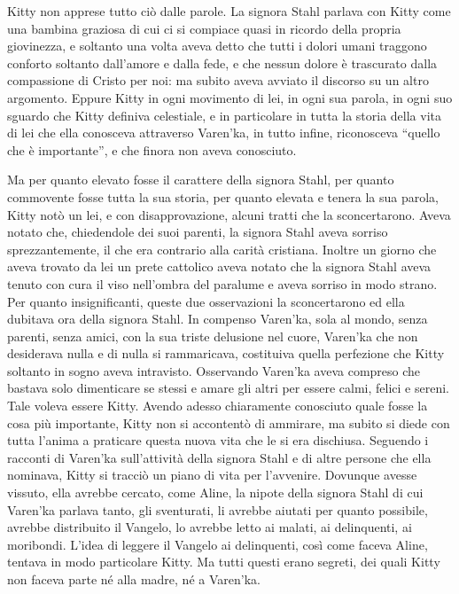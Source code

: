 Kitty non apprese tutto ciò dalle parole. La signora Stahl parlava con Kitty come una bambina graziosa di cui ci si compiace quasi in ricordo della propria giovinezza, e soltanto una volta aveva detto che tutti i dolori umani traggono conforto soltanto dall'amore e dalla fede, e che nessun dolore è trascurato dalla compassione di Cristo per noi: ma subito aveva avviato il discorso su un altro argomento. Eppure Kitty in ogni movimento di lei, in ogni sua parola, in ogni suo sguardo che Kitty definiva celestiale, e in particolare in tutta la storia della vita di lei che ella conosceva attraverso Varen'ka, in tutto infine, riconosceva ``quello che è importante'', e che finora non aveva conosciuto. 

Ma per quanto elevato fosse il carattere della signora Stahl, per quanto commovente fosse tutta la sua storia, per quanto elevata e tenera la sua parola, Kitty notò un lei, e con disapprovazione, alcuni tratti che la sconcertarono. Aveva notato che, chiedendole dei suoi parenti, la signora Stahl aveva sorriso sprezzantemente, il che era contrario alla carità cristiana. Inoltre un giorno che aveva trovato da lei un prete cattolico aveva notato che la signora Stahl aveva tenuto con cura il viso nell'ombra del paralume e aveva sorriso in modo strano. Per quanto insignificanti, queste due osservazioni la sconcertarono ed ella dubitava ora della signora Stahl. In compenso Varen'ka, sola al mondo, senza parenti, senza amici, con la sua triste delusione nel cuore, Varen'ka che non desiderava nulla e di nulla si rammaricava, costituiva quella perfezione che Kitty soltanto in sogno aveva intravisto. Osservando Varen'ka aveva compreso che bastava solo dimenticare se stessi e amare gli altri per essere calmi, felici e sereni. Tale voleva essere Kitty. Avendo adesso chiaramente conosciuto quale fosse la cosa più importante, Kitty non si accontentò di ammirare, ma subito si diede con tutta l'anima a praticare questa nuova vita che le si era dischiusa. Seguendo i racconti di Varen'ka sull'attività della signora Stahl e di altre persone che ella nominava, Kitty si tracciò un piano di vita per l'avvenire. Dovunque avesse vissuto, ella avrebbe cercato, come Aline, la nipote della signora Stahl di cui Varen'ka parlava tanto, gli sventurati, li avrebbe aiutati per quanto possibile, avrebbe distribuito il Vangelo, lo avrebbe letto ai malati, ai delinquenti, ai moribondi. L'idea di leggere il Vangelo ai delinquenti, così come faceva Aline, tentava in modo particolare Kitty. Ma tutti questi erano segreti, dei quali Kitty non faceva parte né alla madre, né a Varen'ka. 

